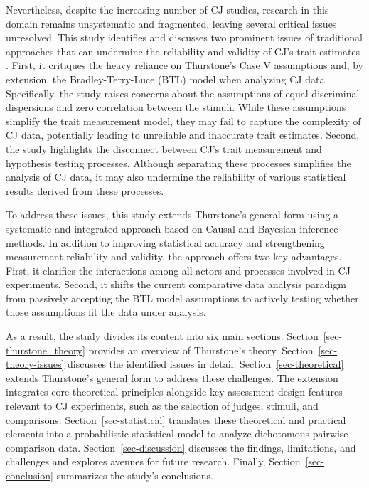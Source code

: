 \documentclass[
  authoryear,
  review,
  1p]{elsarticle}
\begin{document}
Nevertheless, despite the increasing number of CJ studies, research in
this domain remains unsystematic and fragmented, leaving several
critical issues unresolved. This study identifies and discusses two
prominent issues of traditional approaches that can undermine the
reliability and validity of CJ's trait estimates
\citep{Perron_et_al_2015}. First, it critiques the heavy reliance on
Thurstone's Case V assumptions \citep{Thurstone_1927b} and, by
extension, the Bradley-Terry-Luce (BTL) model
\citep{Bradley_et_al_1952, Luce_1959} when analyzing CJ data.
Specifically, the study raises concerns about the assumptions of equal
discriminal dispersions and zero correlation between the stimuli. While
these assumptions simplify the trait measurement model, they may fail to
capture the complexity of CJ data, potentially leading to unreliable and
inaccurate trait estimates. Second, the study highlights the disconnect
between CJ's trait measurement and hypothesis testing processes.
Although separating these processes simplifies the analysis of CJ data,
it may also undermine the reliability of various statistical results
derived from these processes.

To address these issues, this study extends Thurstone's general form
using a systematic and integrated approach based on Causal and Bayesian
inference methods. In addition to improving statistical accuracy and
strengthening measurement reliability and validity, the approach offers
two key advantages. First, it clarifies the interactions among all
actors and processes involved in CJ experiments. Second, it shifts the
current comparative data analysis paradigm from passively accepting the
BTL model assumptions to actively testing whether those assumptions fit
the data under analysis.

As a result, the study divides its content into six main sections.
Section~\ref{sec-thurstone_theory} provides an overview of Thurstone's
theory. Section~\ref{sec-theory-issues} discusses the identified issues
in detail. Section~\ref{sec-theoretical} extends Thurstone's general
form to address these challenges. The extension integrates core
theoretical principles alongside key assessment design features relevant
to CJ experiments, such as the selection of judges, stimuli, and
comparisons. Section~\ref{sec-statistical} translates these theoretical
and practical elements into a probabilistic statistical model to analyze
dichotomous pairwise comparison data. Section~\ref{sec-discussion}
discusses the findings, limitations, and challenges and explores avenues
for future research. Finally, Section~\ref{sec-conclusion} summarizes
the study's conclusions.
\end{document}
